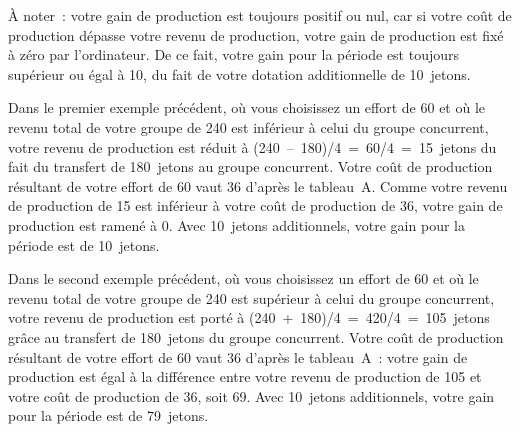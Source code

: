 \begin{Article}
\begin{refsection}[Lebourges]
\begin{appendices}
\begin{center}
\noindent{}
\end{center}

À noter~: votre gain de production est toujours positif ou nul, car si
votre coût de production dépasse votre revenu de production, votre gain
de production est fixé à zéro par l'ordinateur. De ce fait, votre gain
pour la période est toujours supérieur ou égal à 10, du fait de votre
dotation additionnelle de 10~jetons.

Dans le premier exemple précédent, où vous choisissez un effort de 60 et
où le revenu total de votre groupe de 240 est inférieur à celui du
groupe concurrent, votre revenu de production est réduit à
(240~--~180)/4~=~60/4~=~15~jetons du fait du transfert de 180~jetons au
groupe concurrent. Votre coût de production résultant de votre effort de
60 vaut 36 d'après le tableau~A. Comme votre revenu de production de 15
est inférieur à votre coût de production de 36, votre gain de production
est ramené à 0. Avec 10~jetons additionnels, votre gain pour la période
est de 10~jetons.

Dans le second exemple précédent, où vous choisissez un effort de 60 et
où le revenu total de votre groupe de 240 est supérieur à celui du
groupe concurrent, votre revenu de production est porté à
(240~+~180)/4~=~420/4~=~105~jetons grâce au transfert de 180~jetons du
groupe concurrent. Votre coût de production résultant de votre effort de
60 vaut 36 d'après le tableau~A~: votre gain de production est égal à la
différence entre votre revenu de production de 105 et votre coût de
production de 36, soit 69. Avec 10~jetons additionnels, votre gain pour
la période est de 79~jetons.


\end{appendices}
\end{refsection}
\end{Article}
